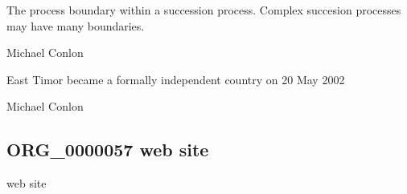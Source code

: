 \documentclass[letterpaper,10pt,english]{sphinxmanual}
\begin{document}
\begin{sphinxShadowBox}

\sphinxAtStartPar
{\hyperref[\detokenize{doc-BFO_0000035::doc}]{}}
\end{sphinxShadowBox}

\begin{sphinxShadowBox}

\sphinxAtStartPar
The process boundary within a succession process.  Complex succesion processes may have many boundaries.
\end{sphinxShadowBox}

\begin{sphinxShadowBox}

\sphinxAtStartPar
Michael Conlon 
\end{sphinxShadowBox}

\begin{sphinxShadowBox}

\sphinxAtStartPar
East Timor became a formally independent country on 20 May 2002
\end{sphinxShadowBox}

\begin{sphinxShadowBox}

\sphinxAtStartPar
Michael Conlon 
\end{sphinxShadowBox}
\begin{quote}

\ignorespaces \end{quote}


\subsection{ORG\_0000057 \sphinxhyphen{} web site}
\label{\detokenize{doc-ORG_0000057:org-0000057-web-site}}\label{\detokenize{doc-ORG_0000057:index-0}}\label{\detokenize{doc-ORG_0000057::doc}}
\begin{sphinxShadowBox}

\sphinxAtStartPar
web site
\end{sphinxShadowBox}
\end{document}
